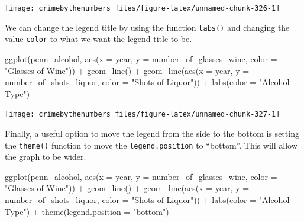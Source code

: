 \documentclass[
]{krantz}
\makeatletter
\newenvironment{Shaded}{\begin{snugshade}}{\end{snugshade}}
\newcommand{\AttributeTok}[1]{\textcolor[rgb]{0.61,0.61,0.61}{#1}}
\newcommand{\FunctionTok}[1]{\textcolor[rgb]{0,0,0}{#1}}
\newcommand{\NormalTok}[1]{#1}
\newcommand{\SpecialCharTok}[1]{\textcolor[rgb]{0,0,0}{#1}}
\newcommand{\StringTok}[1]{\textcolor[rgb]{0.5,0.5,0.5}{#1}}
\newenvironment{kframe}{%
\medskip{}
\setlength{\fboxsep}{.8em}
 \def\at@end@of@kframe{}%
 \ifinner\ifhmode%
  \def\at@end@of@kframe{\end{minipage}}%
  \begin{minipage}{\columnwidth}%
 \fi\fi%
 \def\FrameCommand##1{\hskip\@totalleftmargin \hskip-\fboxsep
 \colorbox{shadecolor}{##1}\hskip-\fboxsep
     \hskip-\linewidth \hskip-\@totalleftmargin \hskip\columnwidth}%
 \MakeFramed {\advance\hsize-\width
   \@totalleftmargin\z@ \linewidth\hsize
   \@setminipage}}%
 {\par\unskip\endMakeFramed%
 \at@end@of@kframe}
\renewenvironment{Shaded}{\begin{kframe}}{\end{kframe}}
\makeatother
\begin{document}
\begin{center}\texttt{[image: crimebythenumbers\_files/figure-latex/unnamed-chunk-326-1]} \end{center}

We can change the legend title by using the function \texttt{labs()} and changing the value \texttt{color} to what we want the legend title to be.

\begin{Shaded}
\begin{Highlighting}[]
\FunctionTok{ggplot}\NormalTok{(penn\_alcohol, }\FunctionTok{aes}\NormalTok{(}\AttributeTok{x =}\NormalTok{ year, }\AttributeTok{y =}\NormalTok{ number\_of\_glasses\_wine,}
                         \AttributeTok{color =} \StringTok{"Glasses of Wine"}\NormalTok{)) }\SpecialCharTok{+}
  \FunctionTok{geom\_line}\NormalTok{() }\SpecialCharTok{+}
  \FunctionTok{geom\_line}\NormalTok{(}\FunctionTok{aes}\NormalTok{(}\AttributeTok{x =}\NormalTok{ year, }\AttributeTok{y =}\NormalTok{ number\_of\_shots\_liquor,}
                \AttributeTok{color =} \StringTok{"Shots of Liquor"}\NormalTok{)) }\SpecialCharTok{+}
  \FunctionTok{labs}\NormalTok{(}\AttributeTok{color =} \StringTok{"Alcohol Type"}\NormalTok{)}
\end{Highlighting}
\end{Shaded}

\begin{center}\texttt{[image: crimebythenumbers\_files/figure-latex/unnamed-chunk-327-1]} \end{center}

Finally, a useful option to move the legend from the side to the bottom is setting the \texttt{theme()} function to move the \texttt{legend.position} to ``bottom''. This will allow the graph to be wider.

\begin{Shaded}
\begin{Highlighting}[]
\FunctionTok{ggplot}\NormalTok{(penn\_alcohol, }\FunctionTok{aes}\NormalTok{(}\AttributeTok{x =}\NormalTok{ year, }\AttributeTok{y =}\NormalTok{ number\_of\_glasses\_wine,}
                         \AttributeTok{color =} \StringTok{"Glasses of Wine"}\NormalTok{)) }\SpecialCharTok{+}
  \FunctionTok{geom\_line}\NormalTok{() }\SpecialCharTok{+}
  \FunctionTok{geom\_line}\NormalTok{(}\FunctionTok{aes}\NormalTok{(}\AttributeTok{x =}\NormalTok{ year, }\AttributeTok{y =}\NormalTok{ number\_of\_shots\_liquor,}
                \AttributeTok{color =} \StringTok{"Shots of Liquor"}\NormalTok{)) }\SpecialCharTok{+}
  \FunctionTok{labs}\NormalTok{(}\AttributeTok{color =} \StringTok{"Alcohol Type"}\NormalTok{) }\SpecialCharTok{+}
  \FunctionTok{theme}\NormalTok{(}\AttributeTok{legend.position =} \StringTok{"bottom"}\NormalTok{)}
\end{Highlighting}
\end{Shaded}
\end{document}

